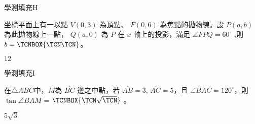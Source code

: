     \begin{QUESTION}
        \begin{ExamInfo}{96}{學測}{填充}{H}
        \end{ExamInfo}
        \begin{ExamAnsRateInfo}{32}{63}{26}{7}
        \end{ExamAnsRateInfo}
        \begin{QBODY}
            坐標平面上有一以點 $V(0, 3)$ 為頂點、 $F(0, 6)$ 為焦點的拋物線。設 $P(a, b)$ 為此拋物線上一點， $Q(a,0)$ 為 $P$ 在 $x$ 軸上的投影，滿足 $\angle FPQ=60^\circ$ ,則 $b= \TCNBOX{\TCN\TCN}$。
        \end{QBODY}
        \begin{QFROMS}
        \end{QFROMS}
        \begin{QTAGS}\end{QTAGS}
        \begin{QANS}
            $12$
        \end{QANS}
        \begin{QSOLLIST}
        \end{QSOLLIST}
        \begin{QEMPTYSPACE}
        \end{QEMPTYSPACE}
    \end{QUESTION}
    \begin{QUESTION}
        \begin{ExamInfo}{96}{學測}{填充}{I}
        \end{ExamInfo}
        \begin{ExamAnsRateInfo}{15}{37}{6}{2}
        \end{ExamAnsRateInfo}
        \begin{QBODY}
            在$\triangle ABC$中，$M$為 $\overline{BC}$ 邊之中點，若 $\overline{AB}=3$, $\overline{AC}=5$，且 $\angle BAC=120^\circ$，則 $\tan \angle BAM$ = 
	$\TCNBOX{\TCN\sqrt{\TCN}}$ 。
        \end{QBODY}
        \begin{QFROMS}
        \end{QFROMS}
        \begin{QTAGS}\end{QTAGS}
        \begin{QANS}
            $5 \sqrt{3}$
        \end{QANS}
        \begin{QSOLLIST}
        \end{QSOLLIST}
        \begin{QEMPTYSPACE}
        \end{QEMPTYSPACE}
    \end{QUESTION}
